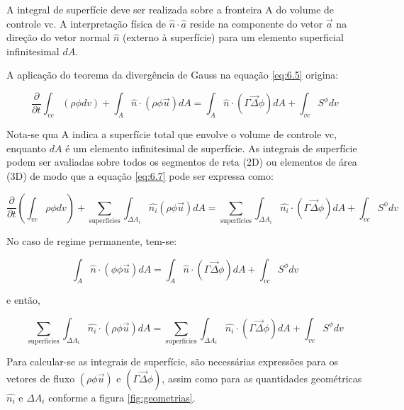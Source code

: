 A integral de superfície deve ser realizada sobre a fronteira A do volume de controle vc. A interpretação física de $\hat{n} \cdot \hat{a}$ reside na componente do vetor $\vec{a}$ na direção do vetor normal $\hat{n}$ (externo à superfície) para um elemento superficial infinitesimal $dA$.

A aplicação do teorema da divergência de Gauss na equação \ref{eq:6.5} origina:

\begin{equation}
    \label{eq:6.7}
    \frac{\partial}{\partial t}\int_{vc} (\rho \phi dv) + \int_A \hat{n} \cdot (\rho \phi \vec{u}) dA = \int_A \hat{n} \cdot (\Gamma \vec{\Delta} \phi)dA + \int_{vc}S^\phi dv
\end{equation}

Nota-se qua A indica a superfície total que envolve o volume de controle vc, enquanto $dA$ é um elemento infinitesimal de superfície. As integrais de superfície podem ser avaliadas sobre todos os segmentos de reta (2D) ou elementos de área (3D) de modo que a equação \ref{eq:6.7} pode ser expressa como:

\begin{equation}
    \label{eq:6.8}
    \frac{\partial}{\partial t}(\int_{vc}\rho \phi dv) + \sum_{\text{superfícies}} \int_{\Delta A_i} \hat{n_i} (\rho \phi \vec{u}) dA= \sum_{\text{superfícies}} \int_{\Delta A_i} \hat{n_i} \cdot (\Gamma \vec{\Delta} \phi) dA + \int_{vc} S^\phi dv
\end{equation}

No caso de regime permanente, tem-se:

\begin{equation}
    \label{eq:6.9}
    \int_A \hat{n} \cdot (\phi \phi \vec{u}) dA = \int_A \hat{n} \cdot (\Gamma \vec{\Delta} \phi) dA + \int_{vc} S^\phi dv
\end{equation}

e então,

\begin{equation}
    \label{eq:6.10}
    \sum_{\text{superfícies}} \int_{\Delta A_i} \hat{n_i} \cdot (\rho \phi \vec{u}) dA = \sum_{\text{superfícies}} \int_{\Delta A_i} \hat{n_i} \cdot (\Gamma \vec{\Delta} \phi) dA + \int_{vc} S^\phi dv
\end{equation}

Para calcular-se as integrais de superfície, são necessárias expressões para os vetores de fluxo $(\rho \phi \vec{u})$ e $(\Gamma \vec{\Delta} \phi)$, assim como para as quantidades geométricas $\hat{n_i}$ e $\Delta A_i$ conforme a figura \ref{fig:geometrias}.

